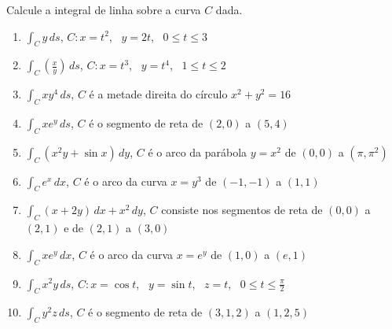\documentclass[a4paper, 12pt]{article}
\begin{document}
	
	
	\vspace{5mm}
	
	Calcule a integral de linha sobre a curva $C$ dada.
	
	\begin{enumerate}
		
		\item $\displaystyle \int_C y \, ds$, \quad $C: x = t^2$, \, $y = 2t$, \, $0 \leq t \leq 3$

		\item $\displaystyle \int_C \left(\frac{x}{y}\right) \, ds$, \quad $C: x = t^3$, \, $y = t^4$, \, $1 \leq t \leq 2$

		\item $\displaystyle \int_C xy^4 \, ds$, \quad $C$ é a metade direita do círculo $x^2 + y^2 = 16$

		\item $\displaystyle \int_C xe^y \, ds$, \quad $C$ é o segmento de reta de $(2,0)$ a $(5,4)$

		\item $\displaystyle \int_C (x^{2}y + \sin x) \, dy$, \quad $C$ é o arco da parábola $y = x^2$ de $(0,0)$ a $(\pi,\pi^2)$

		\item $\displaystyle \int_C e^x \, dx$, \quad $C$ é o arco da curva $x = y^3$ de $(-1,-1)$ a $(1,1)$

		\item $\displaystyle \int_C (x + 2y) \, dx + x^2 \, dy$, \quad $C$ consiste nos segmentos de reta de $(0,0)$ a $(2,1)$ e de $(2,1)$ a $(3,0)$

		\item $\displaystyle \int_C xe^y \, dx$, \quad $C$ é o arco da curva $x = e^y$ de $(1,0)$ a $(e,1)$
		\resposta{\fazer}

		\item $\displaystyle \int_C x^{2}y \, ds$, \quad $C: x = \cos t$, \, $y = \sin t$, \, $z = t$, \, $0 \leq t \leq \frac{\pi}{2}$

		\item $\displaystyle \int_C y^{2}z \, ds$, \quad $C$ é o segmento de reta de $(3,1,2)$ a $(1,2,5)$


\end{enumerate}
\end{document}
